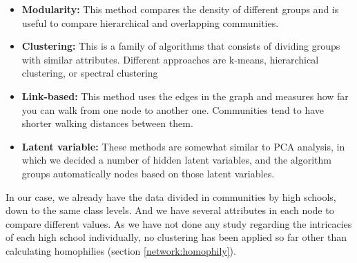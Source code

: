 \begin{itemize}

    \item \textbf{Modularity:} This method compares the density of different groups and is useful to compare hierarchical and overlapping communities.
    
    \item \textbf{Clustering:} This is a family of algorithms that consists of dividing groups with similar attributes. Different approaches are k-means, hierarchical clustering, or spectral clustering
    
    \item \textbf{Link-based:} This method uses the edges in the graph and measures how far you can walk from one node to another one. Communities tend to have shorter walking distances between them.

    \item \textbf{Latent variable:} These methods are somewhat similar to PCA analysis, in which we decided a number of hidden latent variables, and the algorithm groups automatically nodes based on those latent variables.

\end{itemize}

In our case, we already have the data divided in communities by high schools, down to the same class levels. And we have several attributes in each node to compare different values. As we have not done any study regarding the intricacies of each high school individually, no clustering has been applied so far other than calculating homophilies (section \ref{network:homophily}).







